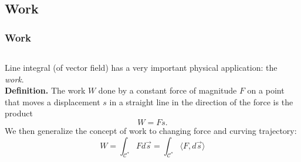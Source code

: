 \documentclass[11pt, t]{beamer}
\renewcommand{\emph}[1]{{\color{Turquoise3}\textsl{#1}}}
\newcommand{\nullspace}{~\\[15pt]}
\begin{document}
\subsection{Work}
\begin{frame}[allowframebreaks]
    \frametitle{Work}
    \begin{columns}
        Line integral (of vector field) has a very important physical application: the \emph{work}.\nullspace
        \textbf{Definition.} The work $W$ done by a constant force of magnitude $F$ on a point that moves a displacement $s$ in a straight line in the direction of the force is the product $$W=Fs.$$ We then generalize the concept of work to changing force and curving trajectory:
        $$W=\int_{\mathcal{C}^{*}} F d \vec{s}=\int_{\mathcal{C}^{*}}\langle F, d \vec{s}\rangle$$


\end{columns}
\end{frame}
\end{document}
